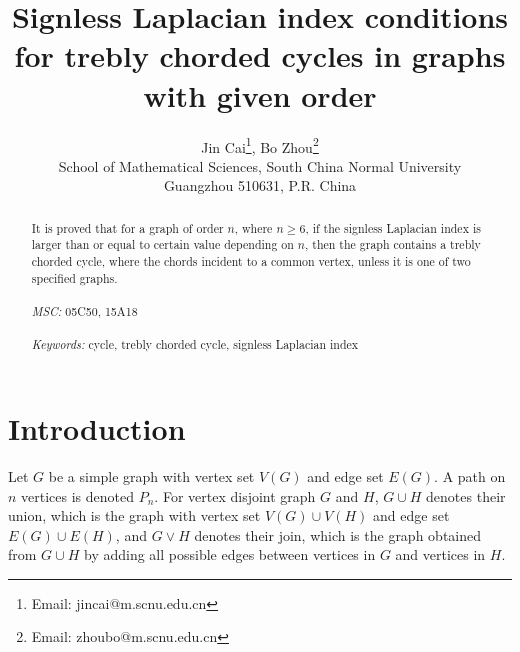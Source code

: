 \documentclass[12pt]{article}
\begin{document}
\title{Signless Laplacian index conditions for  trebly chorded cycles in graphs with given order}



\author{Jin Cai\footnote{Email: jincai@m.scnu.edu.cn}, Bo Zhou\footnote{Email: zhoubo@m.scnu.edu.cn}\\
School of Mathematical Sciences, South China Normal University\\
Guangzhou 510631, P.R. China}

\date{}
\maketitle



\begin{abstract}
It is proved that for a  graph of order $n$, where $n\ge 6$, if the signless Laplacian index is  larger than or equal to certain value depending on $n$, then the graph contains a trebly chorded cycle, where the  chords incident to a common vertex, unless it is one of two specified graphs.
 \\ \\
{\it MSC:} 05C50, 15A18\\ \\
{\it Keywords:} cycle, trebly chorded cycle, signless Laplacian index
\end{abstract}




\section{Introduction}
Let $G$ be a  simple graph with vertex set $V(G)$ and edge set $E(G)$.
A path on $n$ vertices is denoted  $P_n$.
For vertex disjoint graph $G$ and $H$, $G\cup H$ denotes their union, which is the graph
with vertex set $V(G)\cup V(H)$ and edge set $E(G)\cup E(H)$,
and
$G\vee H$ denotes their join, which  is the graph obtained from $G\cup H$ by adding all possible edges between vertices in $G$ and vertices in $H$.
\end{document}
